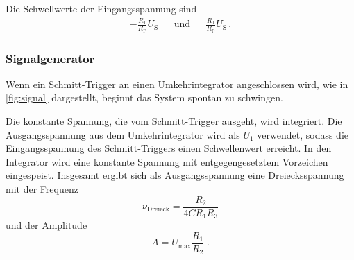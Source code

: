 Die Schwellwerte der Eingangsspannung sind 
\begin{align*}
    - \frac{R_1}{R_\text{P}} U_\text{S} && \text{und} && \frac{R_1}{R_\text{P}} U_\text{S} \, .
\end{align*}

\subsubsection{Signalgenerator}

\noindent 
Wenn ein Schmitt-Trigger an einen Umkehrintegrator angeschlossen wird, wie in \autoref{fig:signal} dargestellt, beginnt das System spontan zu schwingen. 


\noindent
Die konstante Spannung, die vom Schmitt-Trigger ausgeht, wird integriert. Die Ausgangsspannung aus dem Umkehrintegrator wird als $U_1$ verwendet, sodass die Eingangsspannung des Schmitt-Triggers einen Schwellenwert erreicht. In den Integrator wird eine konstante Spannung mit entgegengesetztem Vorzeichen eingespeist. Insgesamt ergibt sich als Ausgangsspannung eine Dreiecksspannung mit 
der Frequenz
\begin{equation*}
    \nu_\text{Dreieck} = \frac{R_2}{4 C R_1 R_3}
\end{equation*}
und der Amplitude 
\begin{equation*}
    A =  U_\text{max} \frac{R_1}{R_2}\;.
\end{equation*}

